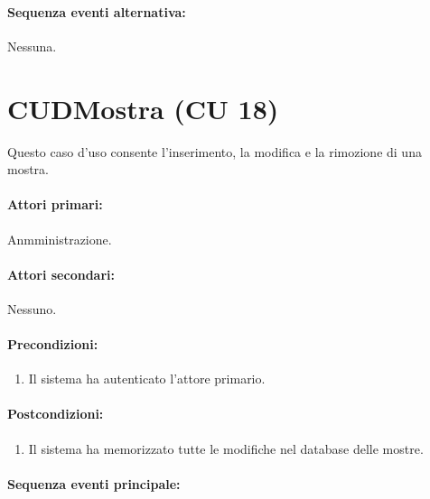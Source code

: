 \documentclass{article}
\begin{document}
	\paragraph{Sequenza eventi alternativa:}Nessuna. 












	
	
	
	
	
	\newpage 

    \section*{CUDMostra (CU 18)}
	
	\indent\indent Questo caso d'uso consente l’inserimento, la modifica e la rimozione di una mostra.
	
	\paragraph{Attori primari:}Anmministrazione.
	
	\paragraph{Attori secondari:}Nessuno.
	
	\paragraph{Precondizioni:}
		\begin{enumerate}	[itemsep=8pt,parsep=0pt]
			\item Il sistema ha autenticato l'attore primario.
		\end{enumerate}
	
	\paragraph{Postcondizioni:}
\begin{enumerate}	[itemsep=8pt,parsep=0pt]
\item Il sistema ha memorizzato tutte le modifiche nel database delle mostre.
\end{enumerate}
	
	\paragraph{Sequenza eventi principale:}
\end{document}

